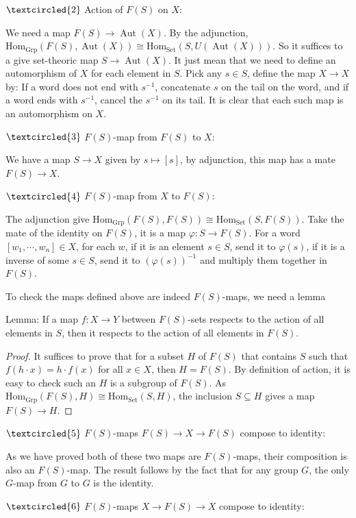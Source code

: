 \documentclass[11pt]{article}
\DeclareMathOperator{\Aut}{Aut}
\DeclareMathOperator{\Grp}{Grp}
\DeclareMathOperator{\Set}{Set}
\newcommand{\Hom}{\text{Hom}}
\theoremstyle{definition}
\begin{document}
$\textcircled{2}$ Action of $F(S)$ on $X$:

We need a map $F(S)\to \Aut (X)$. By the adjunction, $\Hom_{\Grp}(F(S),\Aut(X))\cong \Hom_{\Set}(S,U(\Aut(X)))$. So it suffices to a give set-theoric map $S\to \Aut(X)$. It just mean that we need to define an automorphism of $X$ for each element in $S$. Pick any $s\in S$, define the map $X\to X$ by: If a word does not end with $s^{-1}$, concatenate $s$ on the tail on the word, and if a word ends with $s^{-1}$, cancel the $s^{-1}$ on its tail. It is clear that each such map is an automorphism on $X$.

$\textcircled{3}$ $F(S)$-map from $F(S)$ to $X$:

We have a map $S\to X$ given by $s\mapsto [s]$, by adjunction, this map has a mate $F(S)\to X$. 


$\textcircled{4}$ $F(S)$-map from $X$ to $F(S)$:

The adjunction give $\Hom_{\Grp}(F(S),F(S))\cong \Hom_{\Set}(S,F(S))$. Take the mate of the identity on $F(S)$, it is a map $\varphi:S\to F(S)$. For a word $[w_1,\cdots,w_n]\in X$, for each $w$, if it is an element $s\in S$, send it to $\varphi (s)$, if it is a inverse of some $s\in S$, send it to $(\varphi(s))^{-1}$ and multiply them together in $F(S)$.

To check the maps defined above are indeed $F(S)$-maps, we need a lemma

Lemma: If a map $f:X\to Y$ between $F(S)$-sets respects to the action of all elements in $S$, then it respects to the action of all elements in $F(S)$.

\begin{proof}
  It suffices to prove that for a subset $H$ of $F(S)$ that contains $S$ such that $f(h \cdot x) = h\cdot f(x)$ for all $x\in X$, then $H=F(S)$.
  By definition of action, it is easy to check such an $H$ is a subgroup of $F(S)$. As $\Hom_{\Grp}(F(S),H)\cong \Hom_{\Set}(S,H)$, the inclusion $S\subseteq H$ gives a map $F(S)\to H$. 


\end{proof}

$\textcircled{5}$ $F(S)$-maps $F(S)\to X\to F(S)$ compose to identity:

As we have proved both of these two maps are $F(S)$-maps, their composition is also an $F(S)$-map. The result follows by the fact that for any group $G$, the only $G$-map from $G$ to $G$ is the identity. 

$\textcircled{6}$ $F(S)$-maps $X\to F(S)\to X$ compose to identity:
\end{document}
